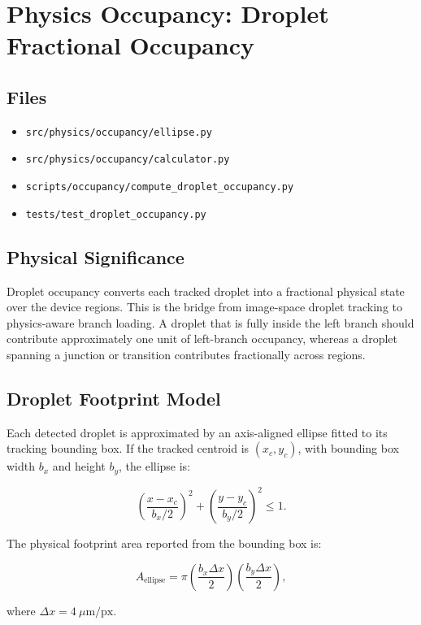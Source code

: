\section{Physics Occupancy: Droplet Fractional Occupancy}

\subsection{Files}

\begin{itemize}
  \item \texttt{src/physics/occupancy/ellipse.py}
  \item \texttt{src/physics/occupancy/calculator.py}
  \item \texttt{scripts/occupancy/compute\_droplet\_occupancy.py}
  \item \texttt{tests/test\_droplet\_occupancy.py}
\end{itemize}

\subsection{Physical Significance}

Droplet occupancy converts each tracked droplet into a fractional physical
state over the device regions. This is the bridge from image-space droplet
tracking to physics-aware branch loading. A droplet that is fully inside the
left branch should contribute approximately one unit of left-branch occupancy,
whereas a droplet spanning a junction or transition contributes fractionally
across regions.

\subsection{Droplet Footprint Model}

Each detected droplet is approximated by an axis-aligned ellipse fitted to its
tracking bounding box. If the tracked centroid is \((x_c,y_c)\), with bounding
box width \(b_x\) and height \(b_y\), the ellipse is:

\[
\left(\frac{x-x_c}{b_x/2}\right)^2
+
\left(\frac{y-y_c}{b_y/2}\right)^2
\le 1.
\]

The physical footprint area reported from the bounding box is:

\[
A_{\mathrm{ellipse}}
=
\pi
\left(\frac{b_x\Delta x}{2}\right)
\left(\frac{b_y\Delta x}{2}\right),
\]

where \(\Delta x=4~\mu\mathrm{m}/\mathrm{px}\).


